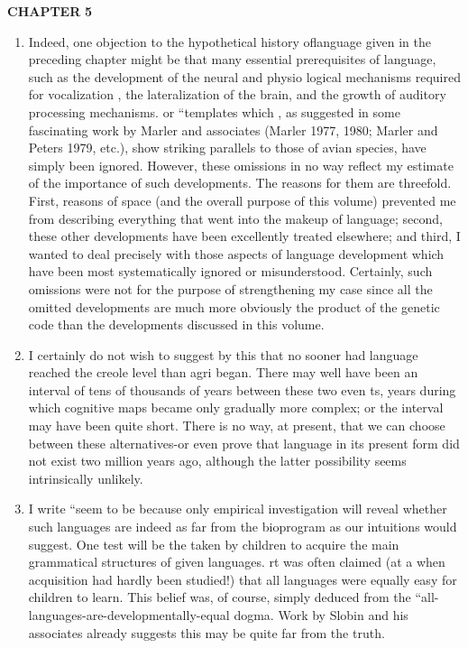 \textbf{CHAPTER} \textbf{5}
\begin{enumerate}
\item Indeed, one objection to the hypothetical history oflanguage given in the preceding chapter might be that many essential prerequi\-sites of language, such as the development of the neural and physio%
logical mechanisms required for vocalization , the lateralization of the brain, and the growth of auditory processing mechanisms. or ``tem\-plates which , as suggested in some fascinating work by Marler and associates (Marler 1977, 1980; Marler and Peters 1979, etc.), show striking parallels to those of avian species, have simply been ignored. However, these omissions in no way reflect my estimate of the impor\-tance of such developments. The reasons for them are threefold. First, reasons of space (and the overall purpose of this volume) pre\-vented me from describing everything that went into the makeup of language; second, these other developments have been excellently treated elsewhere; and third, I wanted to deal precisely with those aspects of language development which have been most systematically ignored or misunderstood. Certainly, such omissions were not for the purpose of strengthening my case since all the omitted developments are much more obviously the product of the genetic code than the developments discussed in this volume. 
\item I certainly do not wish to suggest by this that no sooner had language reached the creole level than agri began. There may well have been an interval of tens of thousands of years between these two even ts, years during which cognitive maps became only gradually more complex; or the interval may have been quite short. There is no way, at present, that we can choose between these alternatives-or even prove that language in its present form did not exist two million years ago, although the latter possibility seems intrinsically unlikely.
\item I write ``seem to be because only empirical investigation will reveal whether such languages are indeed as far from the bio\-program as our intuitions would suggest. One test will be the  taken by children to acquire the main grammatical structures of given 
languages. rt was often claimed (at a  when acquisition had hardly
been studied!) that all languages were equally easy for children to learn. This belief was, of course, simply deduced from the ``all-languages-are-developmentally-equal dogma. Work by Slobin and his associates already suggests this may be quite far from the truth.
\end{enumerate}





  


  
 